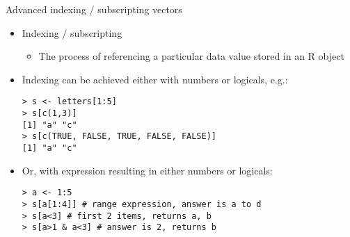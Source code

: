 \documentclass{beamer}
\begin{document}
\begin{frame}{Advanced indexing / subscripting vectors}
    \begin{itemize}
        \item Indexing / subscripting
        \begin{itemize}
            \item The process of referencing a particular data value stored in an R object
        \end{itemize}
        \item Indexing can be achieved either with numbers or logicals, e.g.:
        \begin{verbatim}
> s <- letters[1:5]
> s[c(1,3)]
[1] "a" "c"
> s[c(TRUE, FALSE, TRUE, FALSE, FALSE)]
[1] "a" "c"\end{verbatim}
    \item Or, with expression resulting in either numbers or logicals:
    \begin{verbatim}
> a <- 1:5
> s[a[1:4]] # range expression, answer is a to d
> s[a<3] # first 2 items, returns a, b
> s[a>1 & a<3] # answer is 2, returns b\end{verbatim}
    \end{itemize}
\end{frame}
\end{document}
